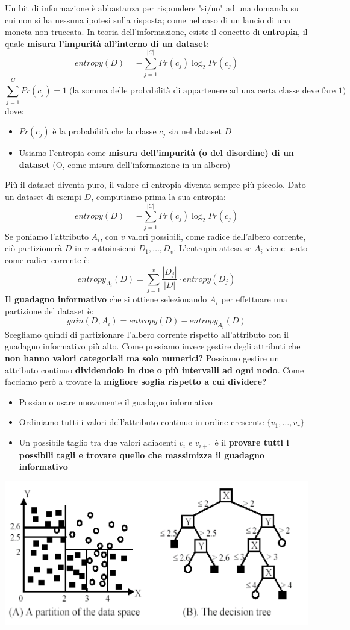 \documentclass[12pt]{article}
\begin{document}
Un bit di informazione è abbastanza per rispondere "si/no" ad una domanda su cui non si ha nessuna ipotesi sulla risposta; come nel caso di un lancio di una moneta non truccata.
In teoria dell'informazione, esiste il concetto di \textbf{entropia}, il quale \textbf{misura l'impurità all'interno di un dataset}:
$$entropy(D) = - \sum_{j=1}^{|C|} Pr(c_j) \log_2 Pr(c_j)$$
$$\sum_{j=1}^{|C|} Pr(c_j) = 1 \; \textrm{(la somma delle probabilità di appartenere ad una certa classe deve fare 1)}$$
dove:
\begin{itemize}
    \item $Pr(c_j)$ è la probabilità che la classe $c_j$ sia nel dataset $D$
    \item Usiamo l'entropia come \textbf{misura dell'impurità (o del disordine) di un dataset} (O, come misura dell'informazione in un albero)
\end{itemize}
Più il dataset diventa puro, il valore di entropia diventa sempre più piccolo.
Dato un dataset di esempi $D$, computiamo prima la sua entropia:
$$entropy(D) = - \sum_{j=1}^{|C|} Pr(c_j) \log_2 Pr(c_j)$$
Se poniamo l'attributo $A_i$, con $v$ valori possibili, come radice dell'albero corrente, ciò partizionerà $D$ in $v$ sottoinsiemi $D_1, \dots, D_v$.
L'entropia attesa se $A_i$ viene usato come radice corrente è:
$$entropy_{A_i}(D) = \sum_{j=1}^{v} \frac{|D_j|}{|D|} \cdot entropy(D_j)$$
\textbf{Il guadagno informativo} che si ottiene selezionando $A_i$ per effettuare una partizione del dataset è:
$$gain(D, A_i) = entropy(D) - entropy_{A_i}(D)$$
Scegliamo quindi di partizionare l'albero corrente rispetto all'attributo con il guadagno informativo più alto.
Come possiamo invece gestire degli attributi che \textbf{non hanno valori categoriali ma solo numerici?}
Possiamo gestire un attributo continuo \textbf{dividendolo in due o più intervalli ad ogni nodo}.
Come facciamo però a trovare la \textbf{migliore soglia rispetto a cui dividere?}
\begin{itemize}
    \item Possiamo usare nuovamente il guadagno informativo
    \item Ordiniamo tutti i valori dell'attributo continuo in ordine crescente $\{v_1, \dots, v_r\}$
    \item Un possibile taglio tra due valori adiacenti $v_i$ e $v_{i+1}$ è il \textbf{provare tutti i possibili tagli e trovare quello che massimizza il guadagno informativo}
\end{itemize}
\begin{center}
    \includegraphics[width =0.80\linewidth]{Images/75.PNG}
\end{center}
\end{document}
